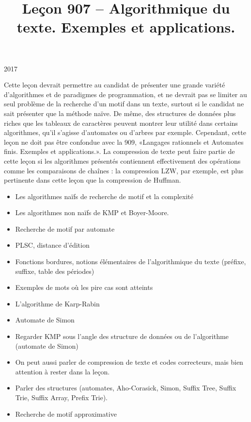 \documentclass{agregfiche}
\title{Leçon 907 -- Algorithmique du texte. Exemples et applications.}
\begin{document}
\maketitle

\secrapports

\begin{rapport}{2017}

    Cette leçon devrait permettre au candidat de présenter une grande variété d’algorithmes et de paradigmes de programmation, et ne devrait pas se limiter au seul problème de la recherche d’un motif dans un texte, surtout si le candidat ne sait présenter que la méthode naïve. De même, des structures de données plus riches que les tableaux de caractères peuvent montrer leur utilité dans certains algorithmes, qu’il s’agisse d’automates ou d’arbres par exemple. Cependant, cette leçon ne doit pas être confondue avec la 909, «Langages rationnels et Automates finis. Exemples et applications.». La compression de texte peut faire partie de cette leçon si les algorithmes présentés contiennent effectivement des opérations comme les comparaisons de chaînes : la compression LZW, par exemple, est plus pertinente dans cette leçon que la compression de Huffman.

\end{rapport}

\secindispensables

\begin{itemize}
    \item Les algorithmes naïfs de recherche de motif et la complexité
    \item Les algorithmes non naïfs de KMP et Boyer-Moore.
    \item Recherche de motif par automate

\end{itemize}

\secasavoir
\begin{itemize}

	\item PLSC, distance d'édition
	\item Fonctions bordures, notions élémentaires de l'algorithmique du texte (préfixe, suffixe, table des périodes)
	\item Exemples de mots où les pire cas sont atteints
\end{itemize}

\secidees

\begin{itemize}
	\item L'algorithme de Karp-Rabin
	\item Automate de Simon
	\item Regarder KMP sous l'angle des structure de données 
	ou de l'algorithme (automate de Simon)
	\item 
	On peut aussi parler de compression de texte et codes 
	correcteurs, mais bien attention à rester dans la leçon.
	\item 
	Parler des structures (automates, Aho-Corasick, Simon,
	Suffix Tree, Suffix Trie, Suffix Array, Prefix Trie).
	
	\item Recherche de motif approximative
\end{itemize}
\end{document}

